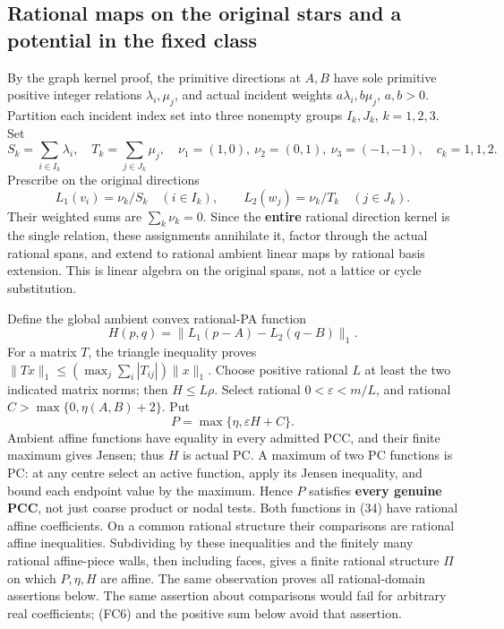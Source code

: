 \documentclass[
  11pt,
]{article}
\begin{document}
\subsection{Rational maps on the original stars and a potential in the
fixed
class}\label{rational-maps-on-the-original-stars-and-a-potential-in-the-fixed-class}

By the graph kernel proof, the primitive directions at \(A,B\) have sole
primitive positive integer relations \(\lambda_i,\mu_j\), and actual
incident weights \(a\lambda_i,b\mu_j\), \(a,b>0\). Partition each
incident index set into three nonempty groups \(I_k,J_k\), \(k=1,2,3\).
Set \[
 S_k=\sum_{i\in I_k}\lambda_i,\quad T_k=\sum_{j\in J_k}\mu_j,
 \quad\nu_1=(1,0),\ \nu_2=(0,1),\ \nu_3=(-1,-1),\quad c_k=1,1,2.
\] Prescribe on the original directions \[
L_1(v_i)=\nu_k/S_k\quad(i\in I_k),\qquad
L_2(w_j)=\nu_k/T_k\quad(j\in J_k).                            \tag{32}
\] Their weighted sums are \(\sum_k\nu_k=0\). Since the \textbf{entire}
rational direction kernel is the single relation, these assignments
annihilate it, factor through the actual rational spans, and extend to
rational ambient linear maps by rational basis extension. This is linear
algebra on the original spans, not a lattice or cycle substitution.

Define the global ambient convex rational-PA function \[
             H(p,q)=\|L_1(p-A)-L_2(q-B)\|_1.                 \tag{33}
\] For a matrix \(T\), the triangle inequality proves
\(\|Tx\|_1\leq(\max_j\sum_i|T_{ij}|)\|x\|_1\). Choose positive rational
\(L\) at least the two indicated matrix norms; then \(H\leq L\rho\).
Select rational \(0<\varepsilon<m/L\), and rational
\(C>\max\{0,\eta(A,B)+2\}\). Put \[
                  P=\max\{\eta,\varepsilon H+C\}.          \tag{34}
\] Ambient affine functions have equality in every admitted PCC, and
their finite maximum gives Jensen; thus \(H\) is actual PC. A maximum of
two PC functions is PC: at any centre select an active function, apply
its Jensen inequality, and bound each endpoint value by the maximum.
Hence \(P\) satisfies \textbf{every genuine PCC}, not just coarse
product or nodal tests. Both functions in (34) have rational affine
coefficients. On a common rational structure their comparisons are
rational affine inequalities. Subdividing by these inequalities and the
finitely many rational affine-piece walls, then including faces, gives a
finite rational structure \(\Pi\) on which \(P,\eta,H\) are affine. The
same observation proves all rational-domain assertions below. The same
assertion about comparisons would fail for arbitrary real coefficients;
(FC6) and the positive sum below avoid that assertion.
\end{document}
